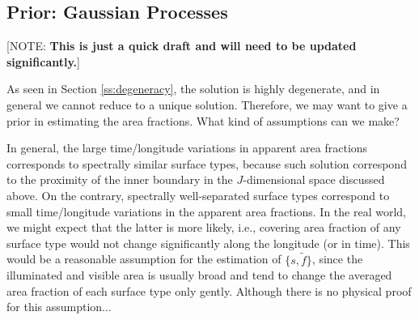 \documentclass[iop,numberedappendix,apj,]{emulateapj}
\def\fast{\tilde f}
\def\memoYF#1{\color{red}[NOTE: {\bf #1}]\color{black}}
\begin{document}
\newpage

\subsection{Prior: Gaussian Processes}
\label{ss:gp}

\memoYF{This is just a quick draft and will need to be updated significantly.}

As seen in Section \ref{ss:degeneracy}, the solution is highly degenerate, and in general we cannot reduce to a unique solution. 
Therefore, we may want to give a prior in estimating the area fractions. 
What kind of assumptions can we make?

In general, the large time/longitude variations in apparent area fractions corresponds to spectrally similar surface types, because such solution correspond to the proximity of the inner boundary in the $J$-dimensional space discussed above. 
On the contrary, spectrally well-separated surface types correspond to small time/longitude variations in the apparent area fractions. 
In the real world, we might expect that the latter is more likely, i.e., covering area fraction of any surface type would not change significantly along the longitude (or in time). 
This would be a reasonable assumption for the estimation of $\{s, \fast \}$, since the illuminated and visible area is usually broad and tend to change the averaged area fraction of each surface type only gently. 
Although there is no physical proof for this assumption...
\end{document}
